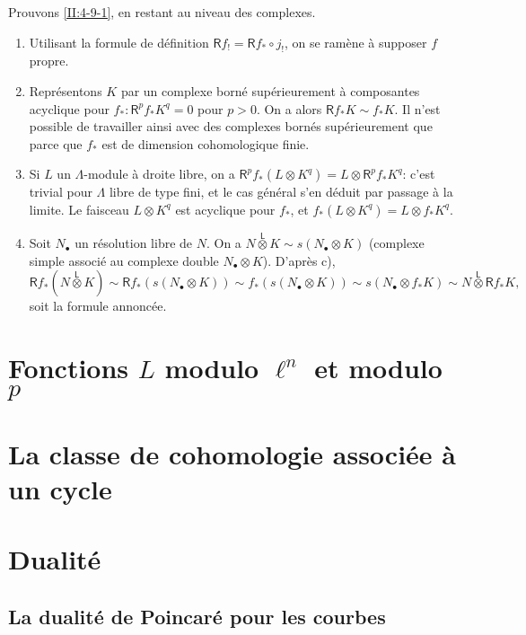 \documentclass{book}
\newcommand{\R}{\mathsf{R}}
\newcommand{\lotimes}{{\overset{\mathsf{L}}{\otimes}}}
\begin{document}
Prouvons \eqref{II:4-9-1}, en restant au niveau des complexes. 
\begin{enumerate}[\indent a)]
  \item Utilisant la formule de d\'efinition $\R f_! = \R f_*\circ j_!$, on se 
    ram\`ene \`a supposer $f$ propre. 
  \item Repr\'esentons $K$ par un complexe born\'e 
    sup\'erieurement \`a composantes acyclique pour $f_*:\R^p f_* K^q = 0$ 
    pour $p>0$. On a alors $\R f_* K \sim f_* K$. Il n'est possible de 
    travailler ainsi avec des complexes born\'es sup\'erieurement que parce que 
    $f_*$ est de dimension cohomologique finie. 
  \item Si $L$ un $\Lambda$-module \`a droite libre, on a 
    $\R^p f_*(L\otimes K^q) = L\otimes \R^p f_* K^q$: c'est trivial pour 
    $\Lambda$ libre de type fini, et le cas g\'en\'eral s'en d\'eduit par 
    passage \`a la limite. Le faisceau $L\otimes K^q$ est acyclique pour 
    $f_*$, et $f_*(L\otimes K^q) = L\otimes f_* K^q$. 
  \item Soit $N_\bullet$ un r\'esolution libre de $N$. On a 
    $N\lotimes K\sim s(N_\bullet\otimes K)$ (complexe simple associ\'e au 
    complexe double $N_\bullet\otimes K$). D'apr\`es c), 
    \[
      \R f_*(N\lotimes K) \sim \R f_* (s(N_\bullet\otimes K)) \sim f_*(s(N_\bullet\otimes K)) \sim s(N_\bullet\otimes f_* K) \sim N\lotimes \R f_* K \text{,}
    \]
    soit la formule annonc\'ee. 
\end{enumerate}










\chapter{Fonctions \texorpdfstring{$L$}{L} modulo \texorpdfstring{$\ell^n$}{l n} et modulo \texorpdfstring{$p$}{p}}\label{III}

\chapter{La classe de cohomologie associée à un cycle}\label{IV}

\chapter{Dualité}\label{V}

\section{La dualité de Poincaré pour les courbes}\label{V:2}
\end{document}
